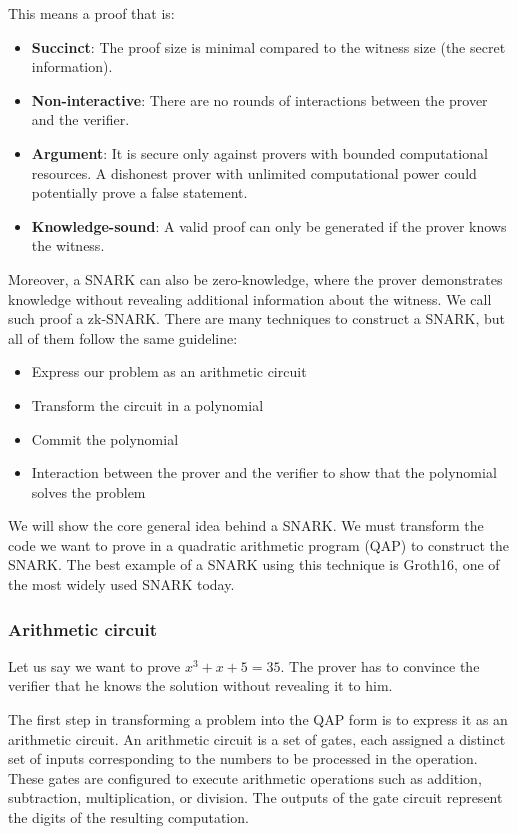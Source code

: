 This means a proof that is:
\begin{itemize}
\item \textbf{Succinct}: The proof size is minimal compared to the witness size (the secret information).
\item \textbf{Non-interactive}: There are no rounds of interactions between the prover and the verifier.
\item \textbf{Argument}: It is secure only against provers with bounded computational resources. A dishonest prover with unlimited computational power could potentially prove a false statement.
\item \textbf{Knowledge-sound}: A valid proof can only be generated if the prover knows the witness. \cite{NZ20}
\end{itemize}

Moreover, a SNARK can also be zero-knowledge, where the prover demonstrates knowledge without revealing additional information about the witness. We call such proof a zk-SNARK.
There are many techniques to construct a SNARK, but all of them follow the same guideline:
\begin{itemize}
   \item Express our problem as an arithmetic circuit
   \item Transform the circuit in a polynomial
   \item Commit the polynomial
   \item Interaction between the prover and the verifier to show that the polynomial solves the problem
 \end{itemize}

 We will show the core general idea behind a SNARK. 
We must transform the code we want to prove in a quadratic arithmetic program (QAP) to construct the SNARK.
The best example of a SNARK using this technique is Groth16\cite{GR16}, one of the most widely used SNARK today.


\subsubsection{Arithmetic circuit}
\label{subsec:ac}

Let us say we want to prove $x^3+x+5=35$.
The prover has to convince the verifier that he knows the solution without revealing it to him.

The first step in transforming a problem into the QAP form is to express it as an arithmetic circuit.
An arithmetic circuit is a set of gates, each assigned a distinct set of inputs corresponding to the numbers to be processed in the operation.
These gates are configured to execute arithmetic operations such as addition, subtraction, multiplication, or division. The outputs of the gate circuit represent the digits of the resulting computation.

